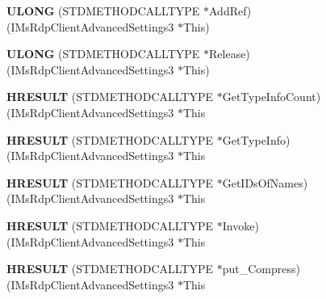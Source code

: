 \begin{DoxyCompactItemize}
\item 
\mbox{\label{struct_i_ms_rdp_client_advanced_settings3_vtbl_adad314645d965506fa7694e3a67dcc13}} 
{\bfseries U\+L\+O\+NG} (S\+T\+D\+M\+E\+T\+H\+O\+D\+C\+A\+L\+L\+T\+Y\+PE $\ast$Add\+Ref)(I\+Ms\+Rdp\+Client\+Advanced\+Settings3 $\ast$This)
\item 
\mbox{\label{struct_i_ms_rdp_client_advanced_settings3_vtbl_a4d757adae08a41e9eed936320e60cabb}} 
{\bfseries U\+L\+O\+NG} (S\+T\+D\+M\+E\+T\+H\+O\+D\+C\+A\+L\+L\+T\+Y\+PE $\ast$Release)(I\+Ms\+Rdp\+Client\+Advanced\+Settings3 $\ast$This)
\item 
\mbox{\label{struct_i_ms_rdp_client_advanced_settings3_vtbl_ae80f8694813050b1dd2f8fb9b12e8f93}} 
{\bfseries H\+R\+E\+S\+U\+LT} (S\+T\+D\+M\+E\+T\+H\+O\+D\+C\+A\+L\+L\+T\+Y\+PE $\ast$Get\+Type\+Info\+Count)(I\+Ms\+Rdp\+Client\+Advanced\+Settings3 $\ast$This
\item 
\mbox{\label{struct_i_ms_rdp_client_advanced_settings3_vtbl_a48859c33ee617bd43a3216d3a9015817}} 
{\bfseries H\+R\+E\+S\+U\+LT} (S\+T\+D\+M\+E\+T\+H\+O\+D\+C\+A\+L\+L\+T\+Y\+PE $\ast$Get\+Type\+Info)(I\+Ms\+Rdp\+Client\+Advanced\+Settings3 $\ast$This
\item 
\mbox{\label{struct_i_ms_rdp_client_advanced_settings3_vtbl_a17738d64a9282bcf5dbbd3370fad5760}} 
{\bfseries H\+R\+E\+S\+U\+LT} (S\+T\+D\+M\+E\+T\+H\+O\+D\+C\+A\+L\+L\+T\+Y\+PE $\ast$Get\+I\+Ds\+Of\+Names)(I\+Ms\+Rdp\+Client\+Advanced\+Settings3 $\ast$This
\item 
\mbox{\label{struct_i_ms_rdp_client_advanced_settings3_vtbl_a2b74605b1778da000068f51814b2656a}} 
{\bfseries H\+R\+E\+S\+U\+LT} (S\+T\+D\+M\+E\+T\+H\+O\+D\+C\+A\+L\+L\+T\+Y\+PE $\ast$Invoke)(I\+Ms\+Rdp\+Client\+Advanced\+Settings3 $\ast$This
\item 
\mbox{\label{struct_i_ms_rdp_client_advanced_settings3_vtbl_a5d747b0d06f237f6d682aeaa0ea37c58}} 
{\bfseries H\+R\+E\+S\+U\+LT} (S\+T\+D\+M\+E\+T\+H\+O\+D\+C\+A\+L\+L\+T\+Y\+PE $\ast$put\+\_\+\+Compress)(I\+Ms\+Rdp\+Client\+Advanced\+Settings3 $\ast$This

\end{DoxyCompactItemize}
